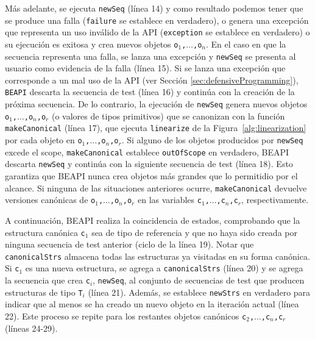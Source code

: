 Más adelante, se ejecuta \texttt{newSeq} (línea 14) y como resultado podemos
tener que se produce una falla (\texttt{failure} se establece en verdadero), o
genera una excepción que representa un uso inválido de la API (\texttt{exception} se establece en verdadero) 
o su ejecución es exitosa y crea nuevos objetos \texttt{o$_1$,$\ldots$,o$_n$}. 
En el caso en que la secuencia representa una falla, se lanza una excepción y
\texttt{newSeq} se presenta al usuario como evidencia de la falla (línea 15). 
Si se lanza una excepción que corresponde a un mal uso de la API (ver Sección
\ref{sec:defensiveProgramming}), \texttt{BEAPI} descarta la secuencia de test
(línea 16) y continúa con la creación de la próxima secuencia. 
De lo contrario, la ejecución de \texttt{newSeq} genera nuevos objetos
\texttt{o$_1$,$\ldots$,o$_n$,o$_r$} (o valores de tipos primitivos) 
que se canonizan con la función \texttt{makeCanonical} (línea 17), que ejecuta
\texttt{linearize} de la Figura~\ref{alg:linearization} por cada objeto en \texttt{o$_1$,$\ldots$,o$_n$,o$_r$}. 
Si alguno de los objetos producidos por \texttt{newSeq} excede el scope,
\texttt{makeCanonical} establece \texttt{outOfScope} en verdadero, \textsf{BEAPI} descarta \texttt{newSeq} 
y continúa con la siguiente secuencia de test (línea 18).
Esto garantiza que \textsf{BEAPI} nunca crea objetos más grandes que lo permitidio por el alcance.
Si ninguna de las situaciones anteriores ocurre,  
\texttt{makeCanonical} devuelve versiones canónicas de \texttt{o$_1$,$\ldots$,o$_n$,o$_r$} en las variables \texttt{c$_1$,$\ldots$,c$_n$,c$_r$}, respectivamente.

A continuación, \textsf{BEAPI} realiza la coincidencia de estados, comprobando que la estructura canónica \texttt{c$_1$} sea de tipo de referencia 
y que no haya sido creada por ninguna secuencia de test anterior (ciclo de la
línea 19). 
Notar que \texttt{canonicalStrs} almacena todas las estructuras ya visitadas en
su forma canónica. 
Si \texttt{c$_1$} es una nueva estructura, se agrega a \texttt{canonicalStrs} (línea 20) y se agrega la secuencia que crea \texttt{c$_i$}, 
\texttt{newSeq}, al conjunto de secuencias de test que producen estructuras de tipo \texttt{T$_i$} (línea 21).
Además, se establece \texttt{newStrs} en verdadero para indicar que al menos se ha creado un nuevo objeto en la iteración actual (línea 22). 
Este proceso se repite para los restantes objetos canónicos \texttt{c$_2$,$\ldots$,c$_n$,c$_r$} (líneas 24-29).


